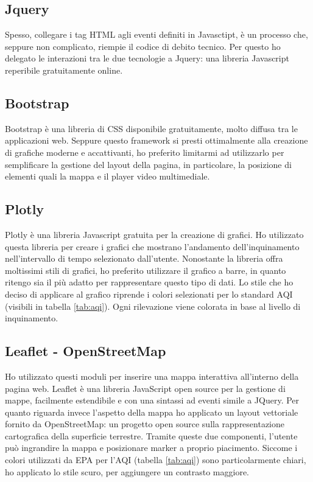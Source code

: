 \subsection{Jquery}
Spesso, collegare i tag HTML agli eventi definiti in Javasctipt, è un processo che, seppure non complicato, riempie il codice di debito tecnico.
Per questo ho delegato le interazioni tra le due tecnologie a Jquery: una libreria Javascript reperibile gratuitamente online.

\subsection{Bootstrap}
Bootstrap è una libreria di CSS disponibile gratuitamente, molto diffusa tra le applicazioni web.
Seppure questo framework si presti ottimalmente alla creazione di grafiche moderne e accattivanti, ho preferito limitarmi ad utilizzarlo per semplificare la gestione del layout della pagina, in particolare,
la posizione di elementi quali la mappa e il player video multimediale.

\subsection{Plotly}
Plotly è una libreria Javascript gratuita per la creazione di grafici.
Ho utilizzato questa libreria per creare i grafici che mostrano l'andamento dell'inquinamento nell'intervallo di tempo selezionato dall'utente.
Nonostante la libreria offra moltissimi stili di grafici, ho preferito utilizzare il grafico a barre, in quanto ritengo sia il più adatto per rappresentare questo tipo di dati.
Lo stile che ho deciso di applicare al grafico riprende i colori selezionati per lo standard AQI (visibili in tabella \ref{tab:aqi}). Ogni rilevazione viene colorata in base al livello di inquinamento.

\subsection{Leaflet - OpenStreetMap}
Ho utilizzato questi moduli per inserire una mappa interattiva all'interno della pagina web.
Leaflet è una libreria JavaScript open source per la gestione di mappe, facilmente estendibile e con una sintassi ad eventi simile a JQuery.
Per quanto riguarda invece l'aspetto della mappa ho applicato un layout vettoriale fornito da OpenStreetMap: un progetto open source sulla rappresentazione cartografica della superficie terrestre.
Tramite queste due componenti, l'utente può ingrandire la mappa e posizionare marker a proprio piacimento.
Siccome i colori utilizzati da EPA per l'AQI (tabella \ref{tab:aqi}) sono particolarmente chiari, ho applicato lo stile scuro, per aggiungere un contrasto maggiore.


